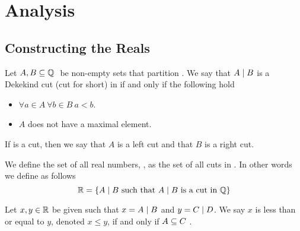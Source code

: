

\chapter{Analysis}
    \section{Constructing the Reals}
        \begin{definition}
            Let $A, B \subseteq \mathbb{Q} \ $ be non-empty sets that
            partition . We say that $A \mid B$
            is a Dekekind cut (cut for short) in  if and only if the following hold
            \begin{itemize}
                \item
                    $\forall a \in A \ \forall b \in B \ a < b$.
                \item
                    $A$ does not have a maximal element.
            \end{itemize}
            If  is a cut, then we say that $A$ is a left cut and that $B$ is a right
            cut.
        \end{definition}
        \begin{definition}
            We define the set of all real numbers, , as the set of all cuts in .
            In other words we define  as follows
            \[
                \mathbb{R} = \left\{\mbox{$A \mid B$ such that $A \mid B$ is a cut in $\mathbb{Q}$}\right\}
            \]
        \end{definition}
        \begin{definition}
            Let $x, y \in \mathbb{R}$ be given such that $x = A \mid B$ and $y = C \mid D$.
            We say $x$ is less than or equal to $y$, denoted $x \le y$, if and only if $A \subseteq C \ $.
        \end{definition}
